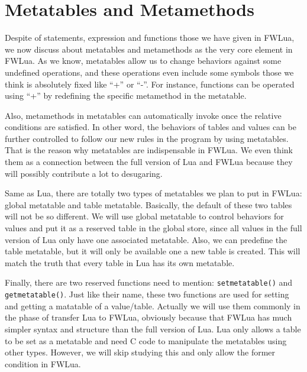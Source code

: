 \newcommand{\abFunction}[2]{{\tt function} ~{#1}~{\tt return}~{#2}~{\tt end}}
\newcommand{\semanticFullRaw}[4]{{#1},{#2} \Downarrow {#3},{#4}}
\newcommand{\semanticFull}[4]{{#1},{#2} \Downarrow {#3}, {#4}}


\section{Metatables and Metamethods}
Despite of statements, expression and functions those we have given in FWLua, we now discuss about metatables and metamethods as the very core element in FWLua. As we know, metatables allow us to change behaviors against some undefined operations, and these operations even include some symbols those we think is absolutely fixed like ``+'' or ``-''. For instance, functions can be operated using ``+'' by redefining the specific metamethod in the metatable. 

Also, metamethods in metatables can automatically invoke once the relative conditions are satisfied. In other word, the behaviors of tables and values can be further controlled to follow our new rules in the program by using metatables. That is the reason why metatables are indispensable in FWLua. We even think them as a connection between the full version of Lua and FWLua because they will possibly contribute a lot to desugaring.

Same as Lua, there are totally two types of metatables we plan to put in FWLua: global metatable and table metatable. Basically, the default of these two tables will not be so different. We will use global metatable to control behaviors for values and put it as a reserved table in the global store, since all values in the full version of Lua only have one associated metatable. Also, we can predefine the table metatable, but it will only be available one a new table is created. This will match the truth that every table in Lua has its own metatable.

Finally, there are two reserved functions need to mention: {\tt setmetatable()} and {\tt getmetatable()}. Just like their name, these two functions are used for setting and getting a matatable of a value/table. Actually we will use them commonly in the phase of transfer Lua to FWLua, obviously because that FWLua has much simpler syntax and structure than the full version of Lua. Lua only allows a table to be set as a metatable and need C code to manipulate the metatables using other types. However, we will skip studying this and only allow the former condition in FWLua.

